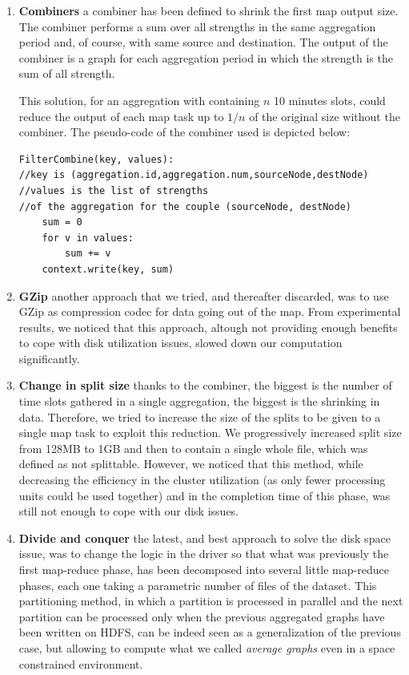 \begin{enumerate}
\item \textbf{Combiners} a combiner has been defined to shrink the first map output size. The combiner performs a sum over all strengths in the same aggregation period and, of course, with same source and destination. 
The output of the combiner is a graph for each aggregation period in which the strength is the sum of all strength.

This solution, for an aggregation with containing $n$ 10 minutes slots, could reduce the output of each map task up to $1/n$ of the original size without the combiner. 
The pseudo-code of the combiner used is depicted below:
\begin{verbatim}
FilterCombine(key, values):
//key is (aggregation.id,aggregation.num,sourceNode,destNode)
//values is the list of strengths 
//of the aggregation for the couple (sourceNode, destNode)
    sum = 0
    for v in values:
        sum += v
    context.write(key, sum)
\end{verbatim}
\item \textbf{GZip} another approach that we tried, and thereafter discarded, was to use GZip as compression codec for data going out of the map. From experimental results, we noticed that this approach, altough not providing enough benefits
to cope with disk utilization issues, slowed down our computation significantly.
\item \textbf{Change in split size} thanks to the combiner, the biggest is the number of time slots gathered in a single aggregation, the biggest is the shrinking in data. 
Therefore, we tried to increase the size of the splits to be given to a single map task to exploit this reduction. We progressively increased split size from 128MB to 1GB and then to contain a single whole file, which was defined as not splittable.
However, we noticed that this method, while decreasing the efficiency in the cluster utilization (as only fewer processing units could be used together) and in the completion time of this phase, was still not enough to cope with our disk issues.
\item \textbf{Divide and conquer} the latest, and best approach to solve the disk space issue, was to change the logic in the driver so that what was previously the first map-reduce phase, has been decomposed into several little map-reduce phases, each one taking a parametric number of files of the dataset.
This partitioning method, in which a partition is processed in parallel and the next partition can be processed only when the previous aggregated graphs have been written on HDFS, can be indeed seen as a generalization of the previous case, but allowing to compute what we called \emph{average graphs} even in a space constrained environment. 

\end{enumerate}
